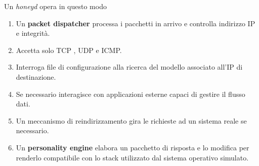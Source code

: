 Un \emph{honeyd} opera in questo modo
\begin{enumerate}
	\item Un \textbf{packet dispatcher} processa i pacchetti in arrivo e controlla indirizzo IP e integrità.
	\item Accetta solo TCP , UDP e ICMP.
	\item Interroga file di configurazione alla ricerca del modello associato all'IP di destinazione.
	\item Se necessario interagisce con applicazioni esterne capaci di gestire il flusso dati.
	\item Un meccanismo di reindirizzamento gira le richieste ad un sistema reale se necessario.
	\item Un \textbf{personality engine} elabora un pacchetto di risposta e lo modifica per renderlo compatibile con
	      lo stack utilizzato dal sistema operativo simulato.
\end{enumerate}